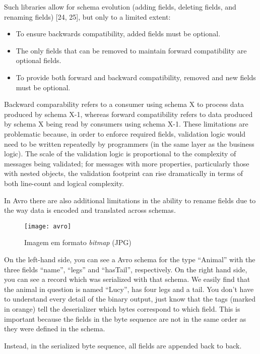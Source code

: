 Such libraries allow for schema evolution (adding fields, deleting fields, and renaming fields) [24, 25], but only to a limited extent:
\begin{itemize}
    \item To ensure backwards compatibility, added fields must be optional.
    \item The only fields that can be removed to maintain forward compatibility are optional fields.
    \item To provide both forward and backward compatibility, removed and new fields must be optional.
\end{itemize}
Backward comparability refers to a consumer using schema X to process data produced by schema X-1,
whereas forward compatibility refers to data produced by schema X being read by consumers using schema X-1.
These limitations are problematic because, in order to enforce required fields, validation logic would need to be written repeatedly by programmers (in the same layer as the business logic).
The scale of the validation logic is proportional to the complexity of messages being validated;
for messages with more properties, particularly those with nested objects, the validation footprint can rise dramatically in terms of both line-count and logical complexity.

In Avro there are also additional limitations in the ability to rename fields due to the way data is encoded and translated across schemas.

\begin{figure}[htbp]
    \centering
    \texttt{[image: avro]}
    \caption{Imagem em formato \emph{bitmap} (JPG)}
    \label{fig:Figuras_Tree_silhouettes-bitmap}
\end{figure}

On the left-hand side, you can see a Avro schema for the type “Animal” with the three fields “name”, “legs” and “hasTail”, respectively. On the right hand side, you can see a record which was serialized with that schema. We easily find that the animal in question is named “Lucy”, has four legs and a tail. You don’t have to understand every detail of the binary output, just know that the tags (marked in orange) tell the deserializer which bytes correspond to which field. This is important because the fields in the byte sequence are not in the same order as they were defined in the schema.

Instead, in the serialized byte sequence, all fields are appended back to back.

